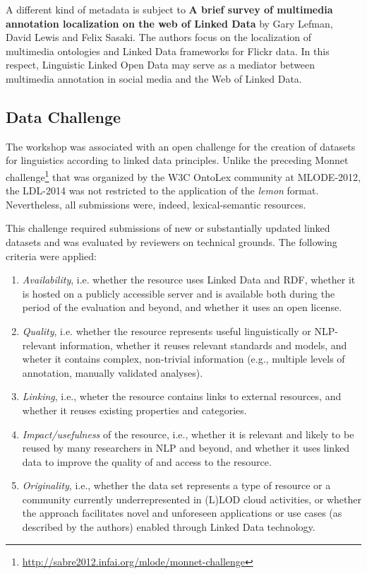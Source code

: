 	A different kind of metadata is subject to \textbf{A brief survey of multimedia annotation localization on the web of Linked Data} by 
	Gary Lefman, David Lewis and Felix Sasaki. The authors focus on the localization of multimedia ontologies and Linked Data frameworks for Flickr data. 
	In this respect, Linguistic Linked Open Data may serve as a mediator between multimedia annotation in social media and the Web of Linked Data. 

\subsection{Data Challenge}

The workshop was associated with an open challenge for the creation of datasets for linguistics according to linked data principles.
Unlike the preceding Monnet challenge\footnote{
	\url{http://sabre2012.infai.org/mlode/monnet-challenge}
} 
that was organized by the W3C OntoLex community at MLODE-2012, the LDL-2014 was not restricted to the application of the \emph{lemon} format. 
Nevertheless, all submissions were, indeed, lexical-semantic resources.
 
This challenge required submissions of new or substantially updated linked datasets and was evaluated by reviewers on technical grounds. 
The following criteria were applied: 

\begin{enumerate}[1.]
\item \emph{Availability}, i.e. whether the resource uses Linked Data and RDF, whether it is hosted on a publicly accessible server and is available both during the period of the evaluation and beyond, and whether it uses an open license.
\item \emph{Quality}, i.e. whether the resource represents useful linguistically or NLP-relevant information, whether it reuses relevant standards and models, and wheter it contains complex, non-trivial information (e.g., multiple levels of annotation, manually validated analyses).
\item \emph{Linking}, i.e., wheter the resource contains links to external resources, and whether it reuses existing properties and categories.
\item \emph{Impact/usefulness} of the resource, i.e., whether it is relevant and likely to be reused by many researchers in NLP and beyond, and whether it uses linked data to improve the quality of and access to the resource.
\item \emph{Originality}, i.e., whether the data set represents a type of resource or a community currently underrepresented in (L)LOD cloud activities, or whether the approach facilitates novel and unforeseen applications or use cases (as described by the authors) enabled through Linked Data technology.
\end{enumerate}

